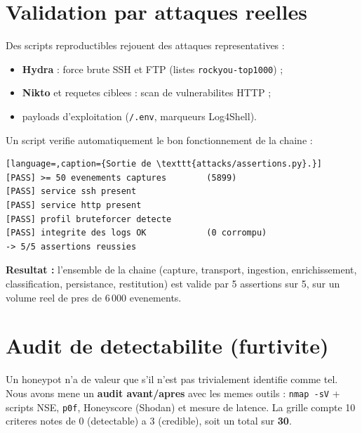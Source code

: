\documentclass[11pt,a4paper]{article}
\begin{document}
\section{Validation par attaques reelles}
Des scripts reproductibles rejouent des attaques representatives :
\begin{itemize}[leftmargin=1.5em,noitemsep]
  \item \textbf{Hydra} : force brute SSH et FTP (listes \texttt{rockyou-top1000}) ;
  \item \textbf{Nikto} et requetes ciblees : scan de vulnerabilites HTTP ;
  \item payloads d'exploitation (\texttt{/.env}, marqueurs Log4Shell).
\end{itemize}

Un script verifie automatiquement le bon fonctionnement de la chaine :

\begin{lstlisting}[language=,caption={Sortie de \texttt{attacks/assertions.py}.}]
[PASS] >= 50 evenements captures        (5899)
[PASS] service ssh present
[PASS] service http present
[PASS] profil bruteforcer detecte
[PASS] integrite des logs OK            (0 corrompu)
-> 5/5 assertions reussies
\end{lstlisting}

\begin{keybox}
\textbf{Resultat :} l'ensemble de la chaine (capture, transport, ingestion,
enrichissement, classification, persistance, restitution) est valide par 5 assertions
sur 5, sur un volume reel de pres de 6\,000 evenements.
\end{keybox}

\section{Audit de detectabilite (furtivite)}
Un honeypot n'a de valeur que s'il n'est pas trivialement identifie comme tel. Nous avons
mene un \textbf{audit avant/apres} avec les memes outils : \texttt{nmap~-sV} + scripts
NSE, \texttt{p0f}, Honeyscore (Shodan) et mesure de latence. La grille compte 10 criteres
notes de 0 (detectable) a 3 (credible), soit un total sur \textbf{30}.
\end{document}
